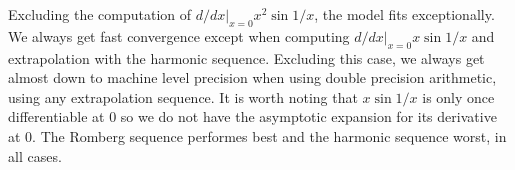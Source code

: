 Excluding the computation of \(d/dx|_{x=0}x^2\sin 1/x\), the model fits exceptionally. We always get fast convergence except when computing \(d/dx|_{x=0}x\sin 1/x\) and extrapolation with the harmonic sequence. Excluding this case, we always get almost down to machine level precision when using double precision arithmetic, using any extrapolation sequence. It is worth noting that \(x\sin 1/x\) is only once differentiable at \(0\) so we do not have the asymptotic expansion for its derivative at \(0\). The Romberg sequence performes best and the harmonic sequence worst, in all cases.\\